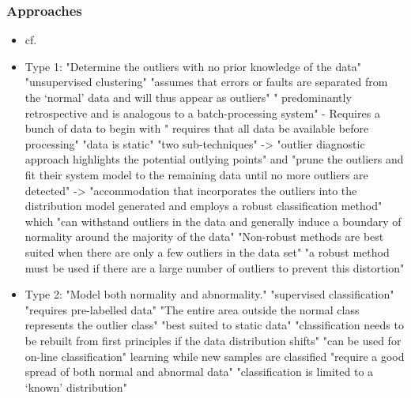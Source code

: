 	\subsubsection{Approaches}
		\begin{itemize}
			\item cf. \textcite{Hodge2004}
			\item Type 1: "Determine the outliers with no prior knowledge of the data" \parencite{Hodge2004}
				\subitem "unsupervised clustering" \parencite{Hodge2004}
				\subitem "assumes that errors or faults are separated from the ‘normal’ data and will thus appear as outliers" \parencite{Hodge2004}
				\subitem " predominantly retrospective and is analogous to a batch-processing system" \parencite{Hodge2004} - Requires a bunch of data to begin with
				\subitem " requires that all data be available before processing" \parencite{Hodge2004}
				\subitem "data is static" \parencite{Hodge2004}
				\subitem "two sub-techniques" \parencite{Hodge2004}
				\subitem -> "outlier diagnostic approach highlights the potential outlying points" \parencite{Hodge2004} and "prune the outliers and fit their system model to the remaining data until no more outliers are detected" \parencite{Hodge2004}
				\subitem -> "accommodation that incorporates the outliers into the distribution model generated and employs a robust classification method" \parencite{Hodge2004} which "can withstand outliers in the data and generally induce a boundary of normality around the majority of the data" \parencite{Hodge2004}
				\subitem "Non-robust methods are best suited when there are only a few outliers in the data set" \parencite{Hodge2004}
				\subitem "a robust method must be used if there are a large number of outliers to prevent this distortion" \parencite{Hodge2004}
			\item Type 2: "Model both normality and abnormality." \parencite{Hodge2004}
				\subitem "supervised classification" \parencite{Hodge2004}
				\subitem "requires pre-labelled data" \parencite{Hodge2004}
				\subitem "The entire area outside the normal class represents the outlier class" \parencite{Hodge2004}
				\subitem "best suited to static data" \parencite{Hodge2004} "classification needs to be rebuilt from first principles if the data distribution shifts" \parencite{Hodge2004}
				\subitem "can be used for on-line classification" \parencite{Hodge2004} learning while new samples are classified
				\subitem "require a good spread of both normal and abnormal data" \parencite{Hodge2004}
				\subitem "classification is limited to a ‘known’ distribution" \parencite{Hodge2004}

\end{itemize}
